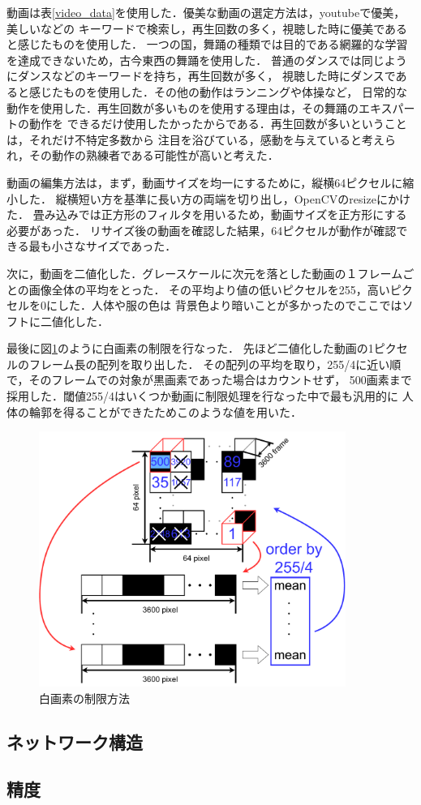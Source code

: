 動画は表\ref{video_data}を使用した．優美な動画の選定方法は，youtubeで優美，美しいなどの
キーワードで検索し，再生回数の多く，視聴した時に優美であると感じたものを使用した．
一つの国，舞踊の種類では目的である網羅的な学習を達成できないため，古今東西の舞踊を使用した．
普通のダンスでは同じようにダンスなどのキーワードを持ち，再生回数が多く，
視聴した時にダンスであると感じたものを使用した．その他の動作はランニングや体操など，
日常的な動作を使用した．再生回数が多いものを使用する理由は，その舞踊のエキスパートの動作を
できるだけ使用したかったからである．再生回数が多いということは，それだけ不特定多数から
注目を浴びている，感動を与えていると考えられ，その動作の熟練者である可能性が高いと考えた．

動画の編集方法は，まず，動画サイズを均一にするために，縦横64ピクセルに縮小した．
縦横短い方を基準に長い方の両端を切り出し，OpenCVのresize\cite{resize}にかけた．
畳み込みでは正方形のフィルタを用いるため，動画サイズを正方形にする必要があった．
リサイズ後の動画を確認した結果，64ピクセルが動作が確認できる最も小さなサイズであった．

次に，動画を二値化した．グレースケールに次元を落とした動画の１フレームごとの画像全体の平均をとった．
その平均より値の低いピクセルを255，高いピクセルを0にした．人体や服の色は
背景色より暗いことが多かったのでここではソフトに二値化した．

最後に図\ref{choice}のように白画素の制限を行なった．
先ほど二値化した動画の1ピクセルのフレーム長の配列を取り出した．
その配列の平均を取り，255/4に近い順で，そのフレームでの対象が黒画素であった場合はカウントせず，
500画素まで採用した．閾値255/4はいくつか動画に制限処理を行なった中で最も汎用的に
人体の輪郭を得ることができたためこのような値を用いた．

\begin{figure}[b]
  \begin{center}
    \includegraphics[width=100mm]{images/chart/choice.pdf}
  \end{center}
  \caption{白画素の制限方法}
  \label{choice}
\end{figure}

\clearpage

\subsection{ネットワーク構造}

\subsection{精度}